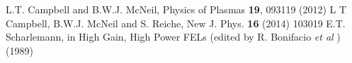 \documentclass[12pt]{article}%
\begin{document}





\begin{thebibliography}{10}

L.T. Campbell and B.W.J. McNeil, Physics of Plasmas {\bf 19}, 093119 (2012)
L T Campbell, B.W.J. McNeil and S. Reiche, New J. Phys. {\bf 16} (2014) 103019
E.T. Scharlemann, in High Gain, High Power FELs (edited by R. Bonifacio \textit{et al} ) (1989)

\end{thebibliography}
\end{document}
